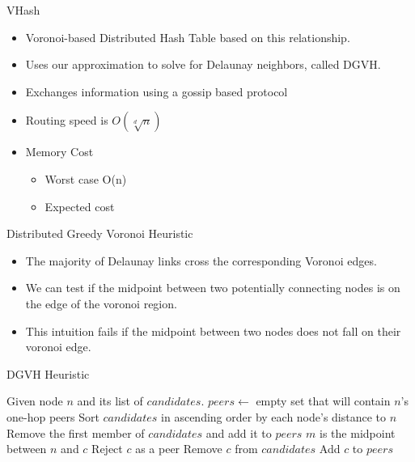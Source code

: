 \documentclass[11pt]{beamer}
\begin{document}
\begin{frame}{VHash}
	\begin{itemize}
		\item Voronoi-based Distributed Hash Table based on this relationship.
		\item Uses our approximation to solve for Delaunay neighbors, called DGVH.
		\item Exchanges information using a gossip based protocol 
		\item Routing speed is $ O(\sqrt[d]{n} ) $
		\item Memory Cost
		\begin{itemize}
			\item Worst case O(n)
			\item Expected cost 
		\end{itemize}
	\end{itemize}
\end{frame}


\begin{frame}{Distributed Greedy Voronoi Heuristic}

	\begin{itemize}
		\item The majority of Delaunay links cross the corresponding Voronoi edges.
		\item We can test if the midpoint between two potentially connecting nodes is on the edge of the voronoi region.
		\item This intuition fails if the midpoint between two nodes does not fall on their voronoi edge.
	\end{itemize}

\end{frame}

\begin{frame}{DGVH Heuristic}

		\begin{algorithmic}[1]  %
			\STATE Given node $n$ and its list of $candidates$.
			\STATE $peers \leftarrow$ empty set that will contain $n$'s one-hop peers
			\STATE Sort $candidates$ in ascending order by each node's distance to $n$
			\STATE Remove the first member of $candidates$ and add it to $peers$
			\STATE $m$ is the midpoint between $n$ and $c$
			\STATE Reject $c$ as a peer
			\ELSE
			\STATE Remove $c$ from $candidates$
			\STATE Add $c$ to $peers$
			\ENDIF
			\ENDFOR
		\end{algorithmic}

\end{frame}
\end{document}
